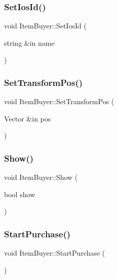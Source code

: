 \hypertarget{class_item_buyer_a2152ce6e0481e0c69ca79613bfaa206f}{}\label{class_item_buyer_a2152ce6e0481e0c69ca79613bfaa206f} 
\subsubsection{\texorpdfstring{Set\+Ios\+Id()}{SetIosId()}}
{\footnotesize\ttfamily void Item\+Buyer\+::\+Set\+Ios\+Id (\begin{DoxyParamCaption}\item[{string \&in}]{name }\end{DoxyParamCaption})}

\hypertarget{class_item_buyer_a00ef3bcc525128ea02ea433735b2a214}{}\label{class_item_buyer_a00ef3bcc525128ea02ea433735b2a214} 
\subsubsection{\texorpdfstring{Set\+Transform\+Pos()}{SetTransformPos()}}
{\footnotesize\ttfamily void Item\+Buyer\+::\+Set\+Transform\+Pos (\begin{DoxyParamCaption}\item[{Vector \&in}]{pos }\end{DoxyParamCaption})}

\hypertarget{class_item_buyer_ac21a4b32aa87d9f5686cac9f75144a74}{}\label{class_item_buyer_ac21a4b32aa87d9f5686cac9f75144a74} 
\subsubsection{\texorpdfstring{Show()}{Show()}}
{\footnotesize\ttfamily void Item\+Buyer\+::\+Show (\begin{DoxyParamCaption}\item[{bool}]{show }\end{DoxyParamCaption})}

\hypertarget{class_item_buyer_a74d2fbbfb6fc81924e4e53d3e82abb1b}{}\label{class_item_buyer_a74d2fbbfb6fc81924e4e53d3e82abb1b} 
\subsubsection{\texorpdfstring{Start\+Purchase()}{StartPurchase()}}
{\footnotesize\ttfamily void Item\+Buyer\+::\+Start\+Purchase (\begin{DoxyParamCaption}{ }\end{DoxyParamCaption})}

